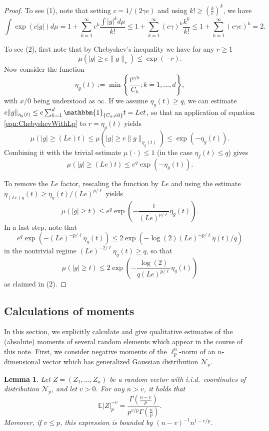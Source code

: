 \documentclass[a4paper,12pt]{amsart}
\numberwithin{equation}{section}
\newtheorem{lemma}[satz]{Lemma}
\theoremstyle{remark}
\def\E{{\mathbb E}}
\begin{document}
\begin{proof}
    To see (1), note that  setting $c = 1/(2 \gamma e)$ and using $k! \ge (\frac{k}{e})^k$, we have
\[
\int \exp(c|g|) d\mu = 1 + \sum_{k=1}^{\infty} c^k \frac{\int |g|^k d\mu}{k!} 
\le 1 + \sum_{k=1}^{\infty} (c \gamma)^k \frac{k^k}{k!}
\le 1 + \sum_{k=1}^{\infty} (c \gamma e)^k = 2.
\]

To see (2), first note that by Chebyshev's inequality we have for any $r \ge 1$
  \begin{equation}  \label{eqn:ChebyshevWithLp}
    \mu (|g| \ge e \lVert g \rVert_r) \le \exp(-r).
  \end{equation}
  Now consider the function
  \[
    \eta_g(t) := \min \left\{ \frac{t^{p/k}}{C_k} \colon k = 1, \ldots, d \right\},
  \]
  with $x/0$ being understood as $\infty$. If we assume $\eta_g(t) \ge q$, we can estimate $e \lVert g \rVert_{\eta_g(t)} \le e \sum_{k = 1}^{d} \mathbbm{1}_{\{C_k \neq 0\}} t = Let$, so that an application of equation \eqref{eqn:ChebyshevWithLp} to $r = \eta_g(t)$ yields
  \[
    \mu(|g| \ge (Le)t) \le \mu(|g| \ge e\lVert g \rVert_{\eta_g(t)}) \le \exp\left( - \eta_g(t) \right).
  \]
  Combining it with the trivial estimate $\mu(\cdot) \le 1$ (in the case $\eta_f(t) \le q$) gives
  \[
    \mu(|g| \ge (Le)t) \le e^q \exp(-\eta_g(t)).
  \]
  
  To remove the $Le$ factor, rescaling the function by $Le$ and using the estimate $\eta_{(Le)g}(t) \ge \eta_g(t)/(Le)^{p/\ell}$ yields
  \[
    \mu(|g| \ge t) \le e^q \exp \left( - \frac{1}{(Le)^{p/\ell}} \eta_g(t) \right).
  \]
  In a last step, note that
  \[
  e^q\exp(- (Le)^{-p/\ell} \eta_g(t)) \le 2 \exp( - \log(2) (Le)^{-p/\ell} \eta(t)/q)
  \]
  in the nontrivial regime $(Le)^{-2/\ell} \eta_g(t) \ge q$, so that
  \[
    \mu(|g| \ge t) \le 2 \exp \left( - \frac{\log(2)}{q(Le)^{p/\ell}} \eta_g(t) \right)
  \]
  as claimed in (2).
\end{proof}

\subsection{Calculations of moments}
In this section, we explicitly calculate and give qualitative estimates of the (absolute) moments of several random elements which appear in the course of this note. First, we consider negative moments of the $\ell_p^n$-norm of an $n$-dimensional vector which has generalized Gaussian distribution $\mathcal{N}_p$.

\begin{lemma}\label{NegMompgenG}
    Let $Z=(Z_1,\ldots,Z_n)$ be a random vector with i.i.d.\ coordinates of distribution $\mathcal{N}_p$, and let $v > 0$. For any $n > v$, it holds that
    \[
    \E  \lvert Z\rvert_p^{-v} = \frac {\Gamma(\frac{n-v}{p})}{p^{v/p} \Gamma(\frac n p)}.
    \]
    Moreover, if $v \le p$, this expression is bounded by $(n-v)^{-1}n^{1-v/p}$.
\end{lemma}
\end{document}
